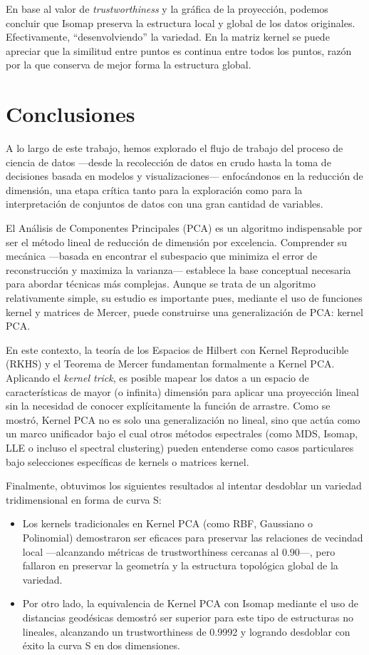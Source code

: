 \documentclass{article}
\numberwithin{equation}{section}
\theoremstyle{remark}
\theoremstyle{definition}
\theoremstyle{remark}
\theoremstyle{remark}
\begin{document}
En base al valor de \textit{trustworthiness} y la gráfica de la proyección, podemos concluir que Isomap preserva la 
estructura local y global de los datos originales. Efectivamente, ``desenvolviendo'' la variedad.
En la matriz kernel se puede apreciar que la similitud entre puntos es continua entre todos los puntos, razón por 
la que conserva de mejor forma la estructura global.

\pagebreak
\section{Conclusiones}
A lo largo de este trabajo, hemos explorado el flujo de trabajo del proceso de ciencia de datos ---desde la recolección de datos en crudo hasta la toma de decisiones 
basada en modelos y visualizaciones--- enfocándonos en la reducción de dimensión, una etapa crítica tanto para la exploración 
como para la interpretación de conjuntos de datos con una gran cantidad de variables. 

El Análisis de Componentes Principales (PCA) es un algoritmo indispensable por ser el método lineal de reducción de dimensión por excelencia. 
Comprender su mecánica —basada en encontrar el subespacio que minimiza el error de reconstrucción y maximiza la varianza— establece la base conceptual necesaria para abordar 
técnicas más complejas. Aunque se trata de un algoritmo relativamente simple, su estudio es importante pues, mediante el uso de funciones kernel y matrices de Mercer,
puede construirse una generalización de PCA: kernel PCA.
 
En este contexto, la teoría de los Espacios de Hilbert con Kernel Reproducible (RKHS) y el Teorema de Mercer fundamentan formalmente a Kernel PCA. 
Aplicando el \textit{kernel trick}, es posible mapear los datos a un espacio de características de mayor (o infinita) dimensión para aplicar una 
proyección lineal sin la necesidad de conocer explícitamente la función de arrastre. Como se mostró, Kernel PCA no es solo una generalización no lineal, 
sino que actúa como un marco unificador bajo el cual otros métodos espectrales (como MDS, Isomap, LLE o incluso el spectral clustering) pueden entenderse como casos 
particulares bajo selecciones específicas de kernels o matrices kernel. 

Finalmente, obtuvimos los siguientes resultados al intentar desdoblar un variedad tridimensional en forma de curva S:  
\begin{itemize}
    \item Los kernels tradicionales en Kernel PCA (como RBF, Gaussiano o Polinomial) demostraron ser eficaces para preservar las relaciones de vecindad local 
    —alcanzando métricas de trustworthiness cercanas al 0.90—, pero fallaron en preservar la geometría y la estructura topológica global de la variedad.  
    \item Por otro lado, la equivalencia de Kernel PCA con Isomap mediante el uso de distancias geodésicas demostró 
    ser superior para este tipo de estructuras no lineales, alcanzando un trustworthiness de 0.9992 y logrando desdoblar con éxito la curva S en dos dimensiones.  
\end{itemize}
\end{document}
